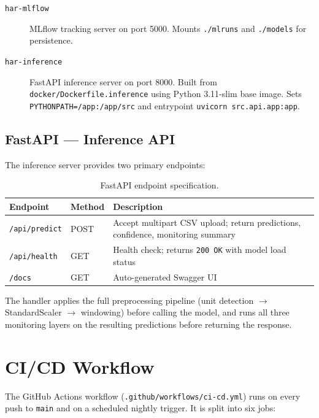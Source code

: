 \begin{description}
  \item[\texttt{har-mlflow}] MLflow tracking server on port 5000.
        Mounts \texttt{./mlruns} and \texttt{./models} for persistence.
  \item[\texttt{har-inference}] FastAPI inference server on port 8000.
        Built from \texttt{docker/Dockerfile.inference} using
        Python 3.11-slim base image.
        Sets \texttt{PYTHONPATH=/app:/app/src} and entrypoint
        \texttt{uvicorn src.api.app:app}.
\end{description}

\subsection{FastAPI — Inference API}

The inference server provides two primary endpoints:

\begin{table}[ht]
  \centering
  \caption{FastAPI endpoint specification.}
  \label{tab:api_endpoints}
  \begin{tabularx}{\linewidth}{llX}
    \toprule
    \textbf{Endpoint} & \textbf{Method} & \textbf{Description} \\
    \midrule
    \texttt{/api/predict}  & POST & Accept multipart CSV upload; return
      predictions, confidence, monitoring summary \\
    \texttt{/api/health}   & GET  & Health check; returns
      \texttt{200 OK} with model load status \\
    \texttt{/docs}         & GET  & Auto-generated Swagger UI \\
    \bottomrule
  \end{tabularx}
\end{table}

The handler applies the full preprocessing pipeline (unit detection $\to$
StandardScaler $\to$ windowing) before calling the model, and runs all three
monitoring layers on the resulting predictions before returning the response.

\section{CI/CD Workflow}
\label{sec:cicd}

The GitHub Actions workflow (\texttt{.github/workflows/ci-cd.yml}) runs on
every push to \texttt{main} and on a scheduled nightly trigger.
It is split into six jobs:

